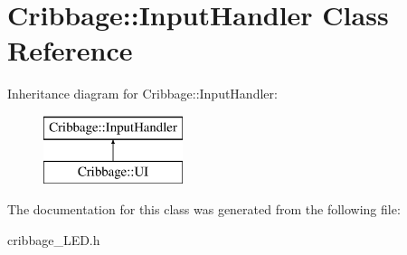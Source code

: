 \hypertarget{class_cribbage_1_1_input_handler}{}\section{Cribbage\+:\+:Input\+Handler Class Reference}
\label{class_cribbage_1_1_input_handler}
Inheritance diagram for Cribbage\+:\+:Input\+Handler\+:\begin{figure}[H]
\begin{center}
\leavevmode
\includegraphics[height=2.000000cm]{class_cribbage_1_1_input_handler}
\end{center}
\end{figure}


The documentation for this class was generated from the following file\+:\begin{DoxyCompactItemize}
\item 
cribbage\+\_\+\+L\+E\+D.\+h\end{DoxyCompactItemize}
